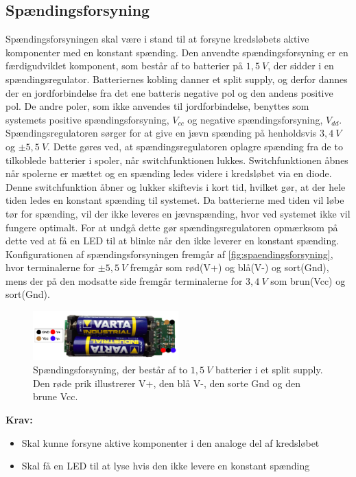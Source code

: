 \subsection{Spændingsforsyning}
Spændingsforsyningen skal være i stand til at forsyne kredsløbets aktive komponenter med en konstant spænding. Den anvendte spændingsforsyning er en færdigudviklet komponent, som består af to batterier på $1,5~V$, der sidder i en spændingsregulator. Batteriernes kobling danner et split supply, og derfor dannes der en jordforbindelse fra det ene batteris negative pol og den andens positive pol. De andre poler, som ikke anvendes til jordforbindelse, benyttes som systemets positive spændingsforsyning, ${V}_{cc}$ og negative spændingsforsyning, ${V}_{dd}$.
Spændingsregulatoren sørger for at give en jævn spænding på henholdsvis $3,4~V$ og $\pm 5,5~V$. Dette gøres ved, at spændingsregulatoren oplagre spænding fra de to tilkoblede batterier i spoler, når switchfunktionen lukkes. Switchfunktionen åbnes når spolerne er mættet og en spænding ledes videre i kredsløbet via en diode. Denne switchfunktion åbner og lukker skiftevis i kort tid, hvilket gør, at der hele tiden ledes en konstant spænding til systemet. Da batterierne med tiden vil løbe tør for spænding, vil der ikke leveres en jævnspænding, hvor ved systemet ikke vil fungere optimalt. For at undgå dette gør spændingsregulatoren opmærksom på dette ved at få en LED til at blinke når den ikke leverer en konstant spænding. 
Konfigurationen af spændingsforsyningen fremgår af \autoref{fig:spaendingsforsyning}, hvor terminalerne for $\pm 5,5~V$ fremgår som rød(V+) og blå(V-) og sort(Gnd), mens der på den modsatte side fremgår terminalerne for $3,4~V$ som brun(Vcc) og sort(Gnd). 

\begin{figure}[H]
\centering
\includegraphics[width=0.5\textwidth]{figures/spaendingsforsyning}
\caption{Spændingsforsyning, der består af to $1,5~V$ batterier i et split supply. Den røde prik illustrerer V+, den blå V-, den sorte Gnd og den brune Vcc.}
\label{fig:spaendingsforsyning}
\end{figure}

\textbf{Krav:}
\begin{itemize} 
\item Skal kunne forsyne aktive komponenter i den analoge del af kredsløbet
\item Skal få en LED til at lyse hvis den ikke levere en konstant spænding
\end{itemize}
